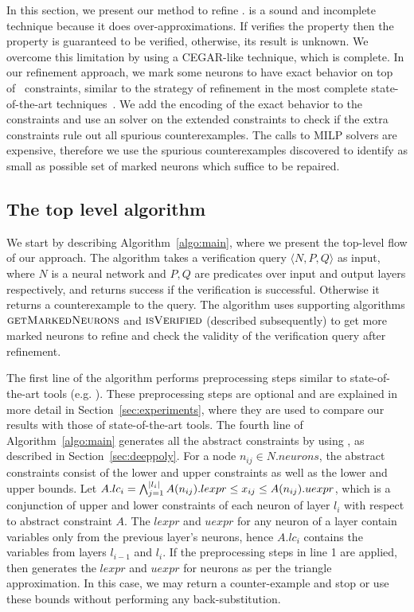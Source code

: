 In this section, we present our method to refine \deeppoly{}. \deeppoly{} is a sound and incomplete technique because it does over-approximations. If \deeppoly{} verifies the property then the property is guaranteed to be verified, otherwise, its result is unknown. We overcome this limitation by using a CEGAR-like technique, which is complete. In our refinement approach, we mark some \relu{} neurons to have exact behavior on top of~\deeppoly{} constraints, similar to the strategy of refinement in the most complete state-of-the-art techniques~\cite{wang2021beta,xu2020fast}. We add the encoding of the exact behavior to the~\deeppoly{} constraints and use an \milp{} solver on the extended constraints to check if the extra constraints rule out all spurious counterexamples. The calls to MILP solvers are expensive, therefore we use the spurious counterexamples discovered to identify as small as possible set of marked neurons which suffice to be repaired. %

\subsection{The top level algorithm}
\label{sec:toplevelalgo}
We start by describing Algorithm~\ref{algo:main}, where we present the top-level flow of our approach. 
The algorithm takes a verification query $\langle N,P,Q \rangle$ as input, where $N$ is a neural network and $P,Q$ are predicates over input and output layers respectively, and returns success if the verification is successful.
Otherwise it returns a counterexample to the query. The algorithm uses supporting algorithms $\textsc{getMarkedNeurons}$ and 
$\textsc{isVerified}$ (described subsequently) to get more marked neurons to refine and check the validity of the verification query  after refinement.


The first line of the algorithm performs preprocessing steps similar to state-of-the-art tools (e.g. \alphabeta{}). These preprocessing steps are optional and are explained in more detail in Section~\ref{sec:experiments}, where they are used to compare our results with those of state-of-the-art tools. The fourth line of Algorithm~\ref{algo:main} generates all the abstract constraints by using \deeppoly{},  as described in Section~\ref{sec:deeppoly}.  For a node $n_{ij} \in N.neurons$, the abstract constraints consist of the lower and upper constraints as well as the lower and upper bounds. 
Let $A.lc_i = \bigwedge_{j=1}^{|l_i|} A(n_{ij}).lexpr \leq x_{ij} \leq  A(n_{ij}).uexpr$, which is a conjunction of upper and lower 
constraints of each neuron of layer $l_i$ with respect to abstract constraint $A$. 
The $lexpr$ and $uexpr$ for any neuron of a layer contain variables only from the previous layer's neurons, hence $A.lc_i$ contains the variables from layers $l_{i-1}$ and $l_i$. If the preprocessing steps in line 1 are applied, then \deeppoly{} generates the $lexpr$ and $uexpr$ for \relu{} neurons as per the triangle approximation. In this case, we may return a counter-example and stop or use these bounds without performing any back-substitution. 

